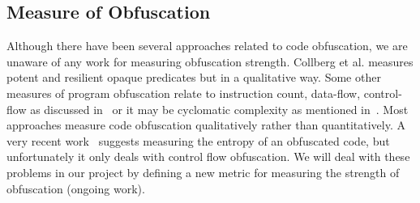 \documentclass[twocolumn]{article}
\begin{document}
\subsection{Measure of Obfuscation}
Although there have been several approaches related to code obfuscation, we are unaware of any work for measuring obfuscation strength. Collberg et al. 
\cite{collberg} measures potent and resilient opaque predicates but in a qualitative way. Some other measures of program obfuscation relate to instruction count, data-flow, 
control-flow as discussed in~\cite{sutter} or it may be cyclomatic complexity as mentioned in~\cite{McCabe}. Most approaches measure code obfuscation qualitatively rather 
than quantitatively. A very recent work~\cite{entropy} suggests measuring the entropy of an obfuscated code, but unfortunately it only deals with control flow obfuscation. We will deal 
with these problems in our project by defining a new metric for measuring the strength of obfuscation (ongoing work).



\end{document}
